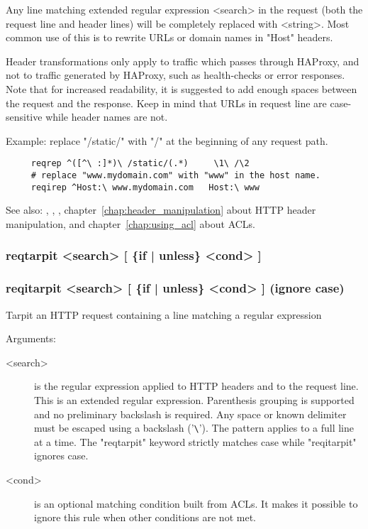   Any line matching extended regular expression <search> in the request (both
  the request line and header lines) will be completely replaced with <string>.
  Most common use of this is to rewrite URLs or domain names in "Host" headers.

  Header transformations only apply to traffic which passes through HAProxy,
  and not to traffic generated by HAProxy, such as health-checks or error
  responses. Note that for increased readability, it is suggested to add enough
  spaces between the request and the response. Keep in mind that URLs in
  request line are case-sensitive while header names are not.

  Example: replace "/static/" with "/" at the beginning of any request path.
  \begin{verbatim}
     reqrep ^([^\ :]*)\ /static/(.*)     \1\ /\2
     # replace "www.mydomain.com" with "www" in the host name.
     reqirep ^Host:\ www.mydomain.com   Host:\ www
  \end{verbatim}


See also: , , , chapter~\ref{chap:header_manipulation} about HTTP header
            manipulation, and chapter~\ref{chap:using_acl} about ACLs.

\subsubsection[reqtarpit]{reqtarpit  <search> [ \{if | unless\} <cond> ]}
\subsubsection[reqitarpit]{reqitarpit <search> [ \{if | unless\} <cond> ]  (ignore case)}


  Tarpit an HTTP request containing a line matching a regular expression


  Arguments:
  \begin{description}
  \item[<search>] is the regular expression applied to HTTP headers and to the
              request line. This is an extended regular expression. Parenthesis
              grouping is supported and no preliminary backslash is required.
              Any space or known delimiter must be escaped using a backslash
              ('\verb|\|'). The pattern applies to a full line at a time. The
              "reqtarpit" keyword strictly matches case while "reqitarpit"
              ignores case.

  \item[<cond>] is an optional matching condition built from ACLs. It makes it
              possible to ignore this rule when other conditions are not met.
  \end{description}

